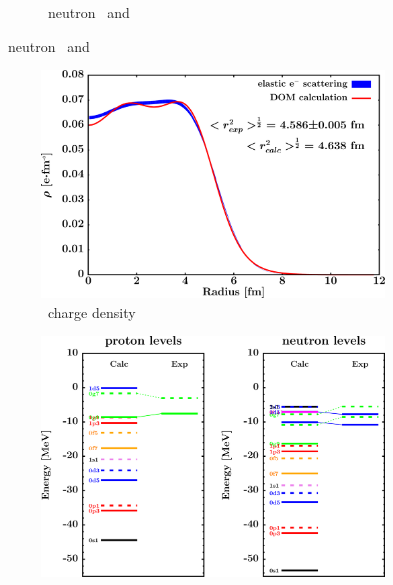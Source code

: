 \begin{figure}[hbtp]
\begin{subfigure}[c]{0.45\textwidth}
        \caption{\snTwelve\ neutron \rxn\ and \tot}
        \label{DOMFitData_sn112_neutron_inelastic}
    \end{subfigure}
\end{figure}
\afterpage{\clearpage}
\begin{figure}[hbtp]
    \captionsetup[subfigure]{labelformat=empty}
    \centering
    \begin{subfigure}[b]{0.45\textwidth}
        \centering
        \includegraphics[width=\linewidth]{figures/sn112_chargeDensity.png}
        \caption{\snTwelve\ charge density}
        \label{DOMFitData_sn112_chargeDensity}
    \end{subfigure}\hspace{6pt}
    \begin{subfigure}[b]{0.45\textwidth}
        \centering
        \includegraphics[width=\linewidth]{figures/sn112_SPLevels.png}

\end{subfigure}
\end{figure}
